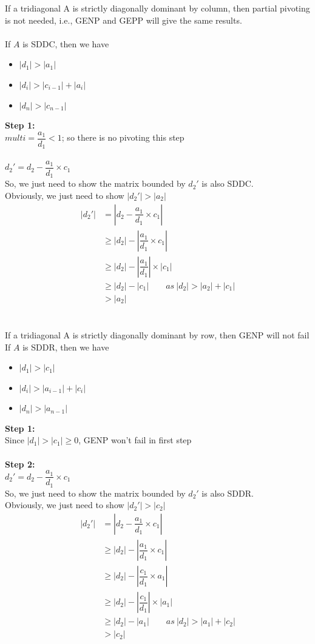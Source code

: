 \documentclass [9 pt]{article}
\theoremstyle{definition}
\begin{document}
\newpage
If a tridiagonal A is strictly diagonally dominant by column, then partial pivoting is not needed, i.e., GENP and GEPP will give the same results.
\\
\\
If $A$ is SDDC, then we have
\begin{itemize}
	\item $ |d_1| > |a_1|$
	\item $ |d_i| > |c_{i-1} | + |a_{i} |  $
	\item $ |d_n| > |c_{n - 1}|$
\end{itemize}
\textbf{Step 1:}\\
$multi = \dfrac{a_1}{d_1} < 1$; so there is no pivoting this step  \\\\
$d_2' =  d_2 - \dfrac{a_1}{d_1} \times c_1 $\\
So, we just need to show the matrix bounded by $d_2'$ is also SDDC.\\
Obviously, we just need to show $| d_2' | > |a_2| $\\
\begin{align*}
	| d_2' | 
	&=  |d_2 - \dfrac{a_1}{d_1} \times c_1 |\\
	&\geq |d_2| - |\dfrac{a_1}{d_1} \times c_1 |\\
	&\geq |d_2| - |\dfrac{a_1}{d_1}| \times | c_1 |\\
	&\geq |d_2| - | c_1 |\quad \quad as \ |d_2| > |a_2| + |c_1|  \\
	&> |a_2| 
\end{align*}
\\
\\
\newline
If a tridiagonal A is strictly diagonally dominant by row, then GENP will not fail
\\
If $A$ is SDDR, then we have
\begin{itemize}
	\item $ |d_1| > |c_1|$
	\item $ |d_i| > |a_{i-1} | + |c_{i} |  $
	\item $ |d_n| > |a_{n - 1}|$
\end{itemize}
\textbf{Step 1:}\\
Since $|d_1| > |c_1| \geq 0$, GENP won't fail in first step\\
\\
\textbf{Step 2:}\\
$d_2' =  d_2 - \dfrac{a_1}{d_1} \times c_1 $\\
So, we just need to show the matrix bounded by $d_2'$ is also SDDR.\\
Obviously, we just need to show $| d_2' | > |c_2| $\\
\begin{align*}
	| d_2' | 
	&=  |d_2 - \dfrac{a_1}{d_1} \times c_1 |\\
	&\geq |d_2| - |\dfrac{a_1}{d_1} \times c_1 |\\
	&\geq |d_2| - |\dfrac{c_1}{d_1} \times a_1 |\\
	&\geq |d_2| - |\dfrac{c_1}{d_1}| \times | a_1 |\\
	&\geq |d_2| - | a_1 |\quad \quad as \ |d_2| > |a_1| + |c_2|  \\
	&>|c_2| 
\end{align*}
\end{document}
